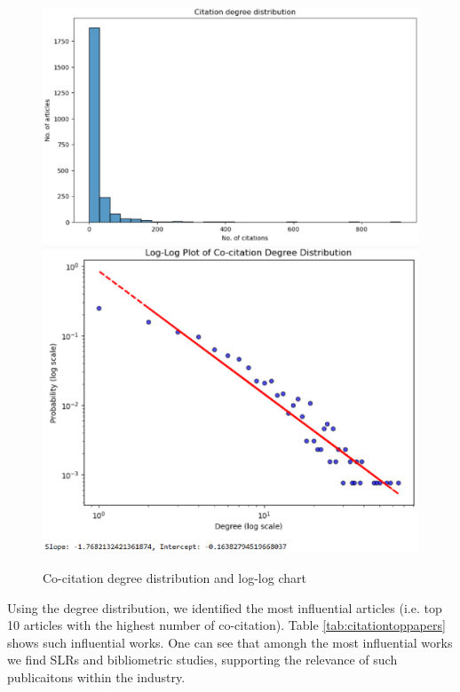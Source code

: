 \documentclass[a4paper, review, endfloat, authoryear]{elsarticle}
\begin{document}
	\begin{figure}[htbp]
		\centering
		\includegraphics[height=0.2\textheight, keepaspectratio]{pics/citation_degree_distribution.eps}
		\includegraphics[height=0.2\textheight, keepaspectratio]{pics/loglog_citation_degree_distribution.eps}
		\caption{Co-citation degree distribution and log-log chart} \label{fig:fig8}
	\end{figure}
	
	Using the degree distribution, we identified the most influential articles (i.e. top 10 articles with the highest number of co-citation). Table \ref{tab:citationtoppapers} shows such influential works. One can see that amongh the most influential works we find SLRs and bibliometric studies, supporting the relevance of such publicaitons within the industry.
	
\end{document}
